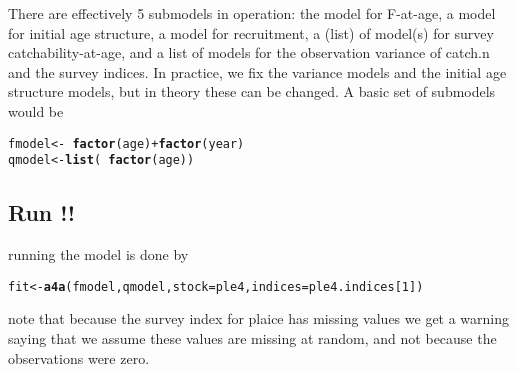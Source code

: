 \documentclass[a4paper,english,10pt]{article}\usepackage[]{graphicx}\usepackage[]{color}
\makeatletter
\newcommand{\hlnum}[1]{\textcolor[rgb]{0.686,0.059,0.569}{#1}}%
\newcommand{\hlopt}[1]{\textcolor[rgb]{0,0,0}{#1}}%
\newcommand{\hlstd}[1]{\textcolor[rgb]{0.345,0.345,0.345}{#1}}%
\newcommand{\hlkwb}[1]{\textcolor[rgb]{0.69,0.353,0.396}{#1}}%
\newcommand{\hlkwc}[1]{\textcolor[rgb]{0.333,0.667,0.333}{#1}}%
\newcommand{\hlkwd}[1]{\textcolor[rgb]{0.737,0.353,0.396}{\textbf{#1}}}%
\newenvironment{kframe}{%
 \def\at@end@of@kframe{}%
 \ifinner\ifhmode%
  \def\at@end@of@kframe{\end{minipage}}%
  \begin{minipage}{\columnwidth}%
 \fi\fi%
 \def\FrameCommand##1{\hskip\@totalleftmargin \hskip-\fboxsep
 \colorbox{shadecolor}{##1}\hskip-\fboxsep
     \hskip-\linewidth \hskip-\@totalleftmargin \hskip\columnwidth}%
 \MakeFramed {\advance\hsize-\width
   \@totalleftmargin\z@ \linewidth\hsize
   \@setminipage}}%
 {\par\unskip\endMakeFramed%
 \at@end@of@kframe}
\newenvironment{knitrout}{}{} %
\makeatother
\begin{document}
There are effectively 5 submodels in operation: the model for F-at-age, a model for initial age structure, a model for recruitment, a (list) of model(s) for survey catchability-at-age, and a list of models for the observation variance of catch.n and the survey indices.  In practice, we fix the variance models and the initial age structure models, but in theory these can be changed.  A basic set of submodels would be

\begin{knitrout}
\color{fgcolor}\begin{kframe}
\begin{alltt}
\hlstd{fmodel} \hlkwb{<-} \hlopt{~}\hlkwd{factor}\hlstd{(age)} \hlopt{+} \hlkwd{factor}\hlstd{(year)}
\hlstd{qmodel} \hlkwb{<-} \hlkwd{list}\hlstd{(}\hlopt{~}\hlkwd{factor}\hlstd{(age))}
\end{alltt}
\end{kframe}
\end{knitrout}


\subsection{Run !!}

running the model is done by

\begin{knitrout}
\color{fgcolor}\begin{kframe}
\begin{alltt}
\hlstd{fit} \hlkwb{<-} \hlkwd{a4a}\hlstd{(fmodel, qmodel,} \hlkwc{stock} \hlstd{= ple4,} \hlkwc{indices} \hlstd{= ple4.indices[}\hlnum{1}\hlstd{])}
\end{alltt}


{\ttfamily\noindent\itshape\color{messagecolor}{\#\# Note: The following observations are treated as being missing at random:\\\#\# 	\ \ \ \ fleet year age\\\#\# 	 BTS-Isis 1997\ \  1\\\#\# 	 BTS-Isis 1997\ \  2\\\#\#\ \ \ \ \ \  Predictions will be made for missing observations.}}\end{kframe}
\end{knitrout}


note that because the survey index for plaice has missing values we get a warning saying that we assume these values are missing at random, and not because the observations were zero.
\end{document}
